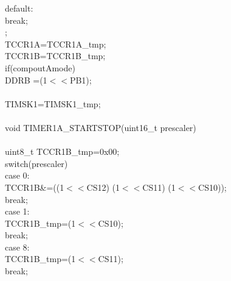 \documentclass[titlepage, a4paper, 10pt, reqno, openany]{report}
\begin{document}
\begin{minipage}[t]{.35\linewidth}
	\hspace*{1cm}		default: \\
	\hspace*{1.5cm}			break; \\
	\hspace*{.5cm}	\textbraceright ; \\
	\hspace*{.5cm}	TCCR1A=TCCR1A\_tmp; \\
	\hspace*{.5cm}	TCCR1B=TCCR1B\_tmp; \\
	\hspace*{.5cm}	if(compoutAmode)\textbraceleft \\
	\hspace*{1cm}		DDRB \textbar =(1$<<$PB1); \\
	\hspace*{.5cm}	\textbraceright \\
	\hspace*{.5cm}	TIMSK1=TIMSK1\_tmp; \\
	\textbraceright \\
	void TIMER1A\_STARTSTOP(uint16\_t prescaler) \\
	\textbraceleft \\
	\hspace*{.5cm}	uint8\_t TCCR1B\_tmp=0x00; \\
	\hspace*{.5cm}	switch(prescaler)\textbraceleft \\
	\hspace*{1cm}		case 0: \\
	\hspace*{1.5cm}			TCCR1B\&=\texttildelow ((1$<<$CS12) \textbar (1$<<$CS11) \textbar (1$<<$CS10)); \\
	\hspace*{1.5cm}			break; \\
	\hspace*{1cm}		case 1: \\
	\hspace*{1.5cm}			TCCR1B\_tmp=(1$<<$CS10); \\
	\hspace*{1.5cm}			break; \\
	\hspace*{1cm}		case 8: \\
	\hspace*{1.5cm}			TCCR1B\_tmp=(1$<<$CS11); \\
	\hspace*{1.5cm}			break; \\

\end{minipage}
\end{document}
